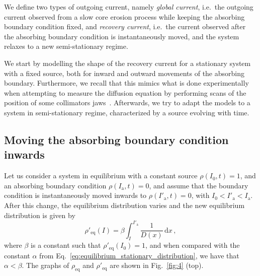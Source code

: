 We define two types of outgoing current, namely \textsl{global current}, i.e.\ the outgoing current observed from a slow core erosion process while keeping the absorbing boundary condition fixed, and \textsl{recovery current}, i.e.\ the current observed after the absorbing boundary condition is instantaneously moved, and the system relaxes to a new semi-stationary regime.

We start by modelling the shape of the recovery current for a stationary system with a fixed source, both for inward and outward movements of the absorbing boundary. Furthermore, we recall that this mimics what is done experimentally when attempting to measure the diffusion equation by performing scans of the position of some collimators jaws~{\cite{MESS1994279,flilleriii:pac03-rpag004,stancari2011diffusion,stancari:ipac11-tupz033,Stancari:1637929,PhysRevSTAB.16.021003,PhysRevAccelBeams.23.044802}}. Afterwards, we try to adapt the models to a system in semi-stationary regime, characterized by a source evolving with time.


\subsection{Moving the absorbing boundary condition inwards}


Let us consider a system in equilibrium with a constant  source $\rho(I_0, t)=1$, and an absorbing boundary condition $\rho(I_\mathrm{a}, t)=0$, and assume that the boundary condition is instantaneously moved inwards to $\rho(I'_\mathrm{a}, t)=0$, with $I_0 < I'_\mathrm{a} < I_\mathrm{a}$. After this change, the equilibrium distribution varies and the new equilibrium distribution is given by
\begin{equation}
    \rho'_\text{eq}(I) = \beta \int_I^{I'_\mathrm{a}} \frac{1}{D(x)}\,\mathrm{d}x\,,
\end{equation}
where $\beta$ is a constant such  that $\rho'_\text{eq}(I_0)=1$, and when compared with the constant $\alpha$ from Eq.~\eqref{eq:equilibrium_stationary_distribution}, we have that $\alpha < \beta$. The graphs of $\rho_\mathrm{eq}$ and $\rho'_\mathrm{eq}$ are shown in Fig.~\ref{fig:4} (top).


